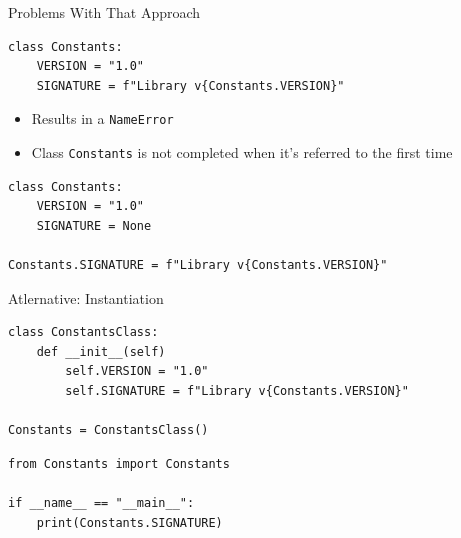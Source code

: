 \begin{frame}[fragile]{Problems With That Approach}
%
\begin{warnbox}[Cross-Referencing Constants, leftupper=7mm]
\begin{verbatim}
class Constants:
    VERSION = "1.0"
    SIGNATURE = f"Library v{Constants.VERSION}"
\end{verbatim}
\end{warnbox}
%
\begin{itemize}
\item Results in a \texttt{NameError}
\item Class \texttt{Constants} is not completed when it's referred to the first time
\end{itemize}
%
\begin{codebox}
\begin{verbatim}
class Constants:
    VERSION = "1.0"
    SIGNATURE = None

Constants.SIGNATURE = f"Library v{Constants.VERSION}"
\end{verbatim}
\end{codebox}
%
\end{frame}


\begin{frame}[fragile]{Atlernative: Instantiation}
%
\begin{codebox}[Constants.py]
\begin{verbatim}
class ConstantsClass:
    def __init__(self)
        self.VERSION = "1.0"
        self.SIGNATURE = f"Library v{Constants.VERSION}"

Constants = ConstantsClass()
\end{verbatim}
\end{codebox}
%
\begin{codebox}[main.py]
\begin{verbatim}
from Constants import Constants

if __name__ == "__main__":
    print(Constants.SIGNATURE)
\end{verbatim}
\end{codebox}
%
\end{frame}


